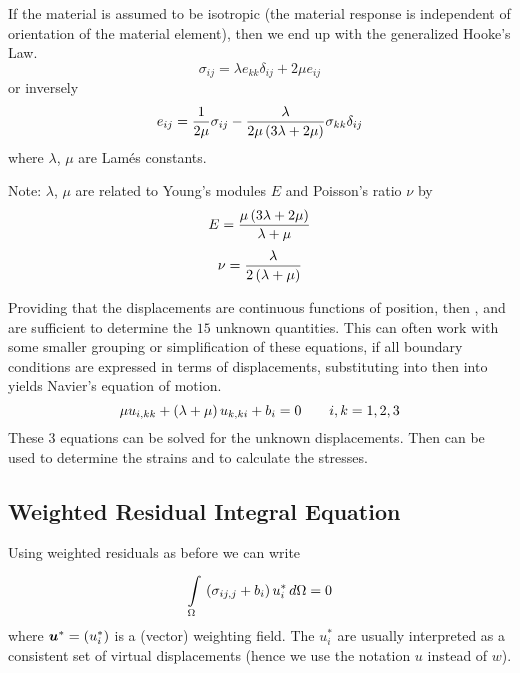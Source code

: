 If the material is assumed to be isotropic (\ie the material response is
independent of orientation of the material element), then we end up with the
generalized Hooke's Law.
\begin{equation}
  \sigma_{ij} = \lambda e_{kk} \delta_{ij} + 2 \mu e_{ij}
  \label{eqn:genHook}
\end{equation}
or inversely
\begin{displaymath}
  e_{ij} = \dfrac{1}{2 \mu} \sigma_{ij} - \dfrac{\lambda}{2 \mu \left( 3 \lambda 
    + 2 \mu \right)} \sigma_{kk} \delta_{ij}
\end{displaymath}
where $\lambda$, $\mu$ are Lam\'{e}s constants.

Note: $\lambda$, $\mu$ are related to Young's modules $E$ and Poisson's 
ratio $\nu$ by 
\begin{displaymath}
  E  =  \dfrac{\mu \left( 3 \lambda + 2 \mu \right)}{\lambda + \mu}
\end{displaymath}
\begin{displaymath}
  \nu = \dfrac{\lambda}{2\left( \lambda + \mu \right)}
\end{displaymath}   

Providing that the displacements are continuous functions of position, then
,  and  are sufficient
to determine the $15$ unknown quantities.  This can often work with some
smaller grouping or simplification of these equations, \eg if all boundary
conditions are expressed in terms of displacements, substituting
 into  then into 
yields Navier's equation of motion.
\begin{displaymath}
  \mu u_{i,kk} + \left( \lambda + \mu \right) u_{k,ki} + b_{i} = 0 \qquad i,k=1,2,3
\end{displaymath}
These $3$ equations can be solved for the unknown displacements. Then
 can be used to determine the strains and 
to calculate the stresses.


\subsection{Weighted Residual Integral Equation}
Using weighted residuals as before we can write
\begin{equation}
     \displaystyle\int\limits_{\Omega}^{} \,\left( \sigma_{ij,j} + b_{i} \right) u_{i}^{*}\,d\Omega   = 0
  \label{eqn:integral}
\end{equation}
where $\vect{u}^{*} = \pbrac{u_{i}^{*}}$ is a (vector) weighting field.  The
$u_{i}^{*}$ are usually interpreted as a consistent set of virtual
displacements (hence we use the notation $u$ instead of $w$).

